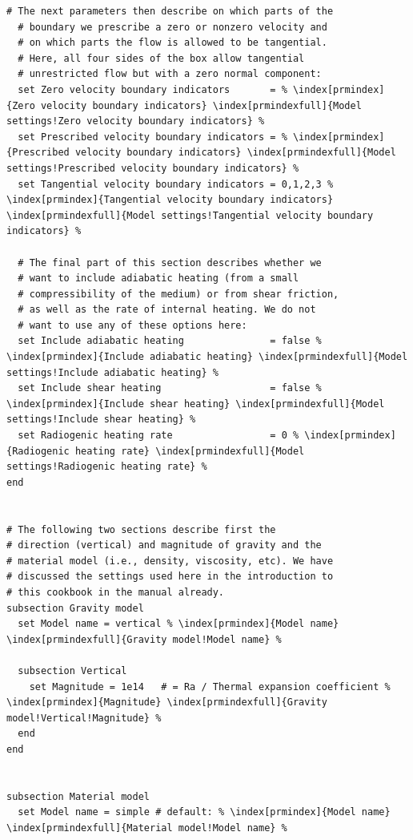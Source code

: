\documentclass{article}
\begin{document}
\begin{lstlisting}[frame=single,language=prmfile,escapechar=\%]
  # The next parameters then describe on which parts of the
  # boundary we prescribe a zero or nonzero velocity and
  # on which parts the flow is allowed to be tangential.
  # Here, all four sides of the box allow tangential
  # unrestricted flow but with a zero normal component:
  set Zero velocity boundary indicators       = % \index[prmindex]{Zero velocity boundary indicators} \index[prmindexfull]{Model settings!Zero velocity boundary indicators} %
  set Prescribed velocity boundary indicators = % \index[prmindex]{Prescribed velocity boundary indicators} \index[prmindexfull]{Model settings!Prescribed velocity boundary indicators} %
  set Tangential velocity boundary indicators = 0,1,2,3 % \index[prmindex]{Tangential velocity boundary indicators} \index[prmindexfull]{Model settings!Tangential velocity boundary indicators} %

  # The final part of this section describes whether we
  # want to include adiabatic heating (from a small
  # compressibility of the medium) or from shear friction,
  # as well as the rate of internal heating. We do not
  # want to use any of these options here:
  set Include adiabatic heating               = false % \index[prmindex]{Include adiabatic heating} \index[prmindexfull]{Model settings!Include adiabatic heating} %
  set Include shear heating                   = false % \index[prmindex]{Include shear heating} \index[prmindexfull]{Model settings!Include shear heating} %
  set Radiogenic heating rate                 = 0 % \index[prmindex]{Radiogenic heating rate} \index[prmindexfull]{Model settings!Radiogenic heating rate} %
end


# The following two sections describe first the
# direction (vertical) and magnitude of gravity and the
# material model (i.e., density, viscosity, etc). We have
# discussed the settings used here in the introduction to
# this cookbook in the manual already.
subsection Gravity model
  set Model name = vertical % \index[prmindex]{Model name} \index[prmindexfull]{Gravity model!Model name} %

  subsection Vertical
    set Magnitude = 1e14   # = Ra / Thermal expansion coefficient % \index[prmindex]{Magnitude} \index[prmindexfull]{Gravity model!Vertical!Magnitude} %
  end
end


subsection Material model
  set Model name = simple # default: % \index[prmindex]{Model name} \index[prmindexfull]{Material model!Model name} %


\end{lstlisting}
\end{document}
